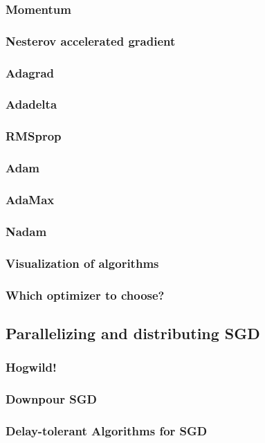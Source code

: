 \documentclass[10pt,a4paper]{ctexbook}
\begin{document}
\subsubsection{Momentum}
\subsubsection{Nesterov accelerated gradient}
\subsubsection{Adagrad}
\subsubsection{Adadelta}
\subsubsection{RMSprop}
\subsubsection{Adam}
\subsubsection{AdaMax}
\subsubsection{Nadam}
\subsubsection{Visualization of algorithms}
\subsubsection{Which optimizer to choose?}

\subsection{Parallelizing and distributing SGD}
\subsubsection{Hogwild!}
\subsubsection{Downpour SGD}
\subsubsection{Delay-tolerant Algorithms for SGD}
\end{document}
